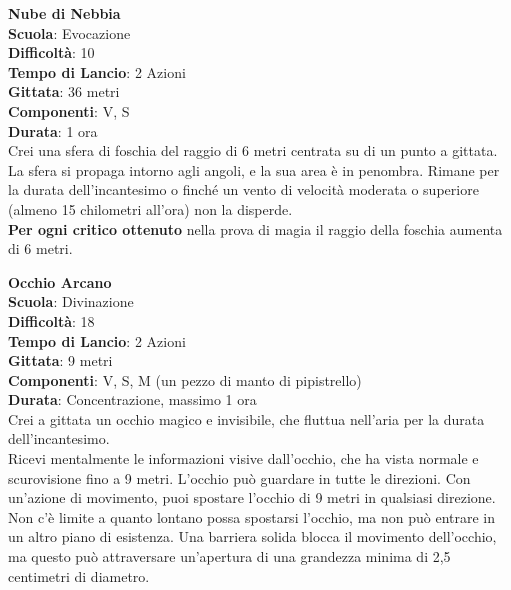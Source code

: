 \begin{multicols}{2}
\medskip\textbf{Nube di Nebbia}\\
\textbf{Scuola}: Evocazione\\
\textbf{Difficoltà}: 10\\
\textbf{Tempo di Lancio}: 2 Azioni\\
\textbf{Gittata}: 36 metri\\
\textbf{Componenti}: V, S\\
\textbf{Durata}: 1 ora\\
Crei una sfera di foschia del raggio di 6 metri centrata su di un punto a gittata. La sfera si propaga intorno agli angoli, e la sua area è in penombra. Rimane per la durata dell'incantesimo o finché un vento di velocità moderata o superiore (almeno 15 chilometri all'ora) non la disperde.\\
\textbf{Per ogni critico ottenuto} nella prova di magia il raggio della foschia aumenta di 6 metri.

\medskip\textbf{Occhio Arcano}\\
\textbf{Scuola}: Divinazione\\
\textbf{Difficoltà}: 18\\
\textbf{Tempo di Lancio}: 2 Azioni\\
\textbf{Gittata}: 9 metri\\
\textbf{Componenti}: V, S, M (un pezzo di manto di pipistrello)\\
\textbf{Durata}: Concentrazione, massimo 1 ora\\
Crei a gittata un occhio magico e invisibile, che fluttua nell'aria per la durata dell'incantesimo.\\
Ricevi mentalmente le informazioni visive dall'occhio, che ha vista normale e scurovisione fino a 9 metri. L'occhio può guardare in tutte le direzioni. Con un'azione di movimento, puoi spostare l'occhio di 9 metri in qualsiasi direzione. Non c'è limite a quanto lontano possa spostarsi l'occhio, ma non può entrare in un altro piano di esistenza. Una barriera solida blocca il movimento dell'occhio, ma questo può attraversare un'apertura di una grandezza minima di 2,5 centimetri di diametro.


\end{multicols}
